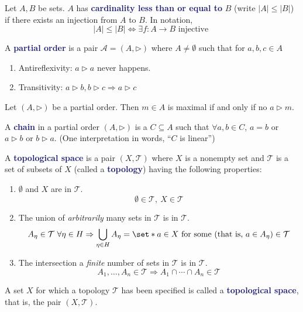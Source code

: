 \documentclass[11pt]{article}
\numberwithin{equation}{section}
\newcommand{\navy}[1]{\textcolor{MidnightBlue}{\bf #1}}
\theoremstyle{definition}
\theoremstyle{definition}
\newcommand\abs[1]{\left| #1 \right|}
\def\Set{\set*}%
\def\imp{\Rightarrow}
\newcommand{\1}{\mathbbm 1}
\newcommand{\aAA}{\mathcal A}
\newcommand{\tT}{\mathcal T}
\begin{document}
\begin{definition}
Let $A, B$ be sets. $A$ has \navy{cardinality less than or equal to} $B$ (write $\abs{A} \leq \abs{B}$) if there exists an injection from $A$ to $B$. In notation,
\begin{equation}
\abs{A} \leq \abs{B} \iff \exists f:A \to B \text{ injective }
\end{equation}
\end{definition}

\begin{definition}
A \navy{partial order} is a pair $\aAA = (A, \triangleright)$ where $A \neq \emptyset$ such that  for $a,b,c \in A$
\begin{enumerate}
\item Antireflexivity: $a \triangleright a$ never happens.
\item Transitivity: $a \triangleright b, b \triangleright c \imp a \triangleright c$
\end{enumerate}
\end{definition}

\begin{definition}[Maximal]
Let $(A, \triangleright)$ be a partial order. Then $m \in A$ is maximal if and only if no $a \triangleright m$.
\end{definition}

\begin{definition}[Chain]
A \navy{chain} in a partial order $(A, \triangleright)$ is a $C \subseteq A$ such that $\forall a,b \in C$, $a=b$ or $a \triangleright b$ or $b \triangleright a$. (One interpretation in words, ``$C$ is linear'')
\end{definition}

\begin{definition}
A \navy{topological space} is a pair $(X,\tT)$ where $X$ is a nonempty set and $\tT$ is a set of subsets of $X$ (called a \navy{topology}) having the following properties:
\begin{enumerate}
\item $\emptyset$ and $X$ are in $\tT$.
\begin{equation}
\emptyset \in \tT,\ X \in \tT
\end{equation}
\item The union of \textit{arbitrarily} many sets in $\tT$ is in $\tT$.
\begin{equation}
A_\eta \in \tT \ \forall \eta \in H \imp \bigcup_{\eta \in H} A_\eta = \Set{a \in X \text{ for some (that is, } a \in A_\eta \text{)}} \in \tT
\end{equation}
\item The intersection a \textit{finite} number of sets in $\tT$ is in $\tT$.
\begin{equation}
A_1, \ldots, A_n \in \tT \imp A_1 \cap \cdots \cap A_n \in \tT
\end{equation}
\end{enumerate}
A set $X$ for which a topology $\tT$ has been specified is called a \navy{topological space}, that is, the pair $(X,\tT)$.
\end{definition}
\end{document}
